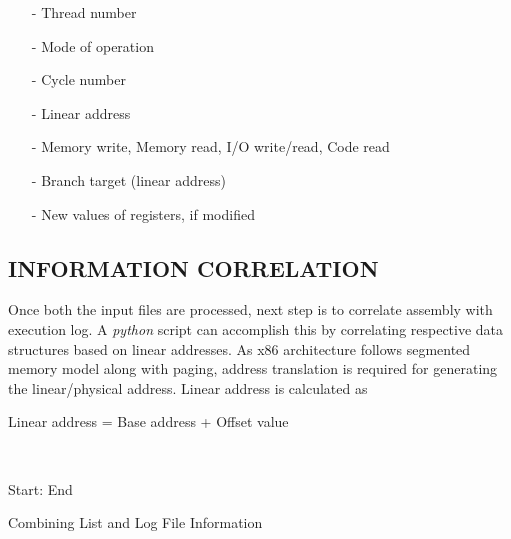 
\begin{itemize}
 \item[-]  Thread number
 \item[-]  Mode of operation
 \item[-]  Cycle number
 \item[-]  Linear address
 \item[-]  Memory write, Memory read, I/O write/read, Code read
 \item[-]  Branch target (linear address)
 \item[-]  New values of registers, if modified
\end{itemize}


\subsection {INFORMATION CORRELATION}

Once both the input files are processed, next step is to correlate assembly with execution log. A {\it python} script can accomplish this by correlating respective data structures based on linear addresses. As x86 architecture follows segmented memory model along with paging, address translation is required for generating the linear/physical address\cite{SS:AMD64-V2}. Linear address is calculated as
\\
\centerline{Linear address = Base address + Offset value}
\\



\IncMargin{1em}
\begin{algorithm}[h]
\DontPrintSemicolon
{} 

\BlankLine
Start: \;
End \;
\caption{Combining List and Log File Information}
\label{algo:impl:cllf}
\end{algorithm}\DecMargin{1em}

